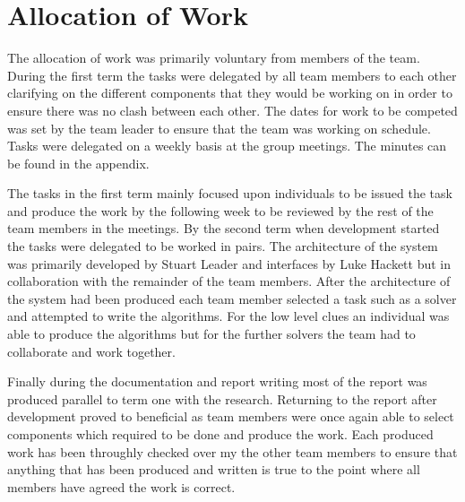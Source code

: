 \section{Allocation of Work}
\label{sec:allocation_of_work}

The allocation of work was primarily voluntary from members of the team. During the first term the tasks were delegated by all team members to each other clarifying on the different components that they would be working on in order to ensure there was no clash between each other. The dates for work to be competed was set by the team leader to ensure that the team was working on schedule. Tasks were delegated on a weekly basis at the group meetings. The minutes can be found in the appendix. 

The tasks in the first term mainly focused upon individuals to be issued the task and produce the work by the following week to be reviewed by the rest of the team members in the meetings. By the second term when development started the tasks were delegated to be worked in pairs. The architecture of the system was primarily developed by Stuart Leader and interfaces by Luke Hackett but in collaboration with the remainder of the team members. After the architecture of the system had been produced each team member selected a task such as a solver and attempted to write the algorithms. For the low level clues an individual was able to produce the algorithms but for the further solvers the team had to collaborate and work together.

Finally during the documentation and report writing most of the report was produced parallel to term one with the research. Returning to the report after development proved to beneficial as team members were once again able to select components which required to be done and produce the work. Each produced work has been throughly checked over my the other team members to ensure that anything that has been produced and written is true to the point where all members have agreed the work is correct. 